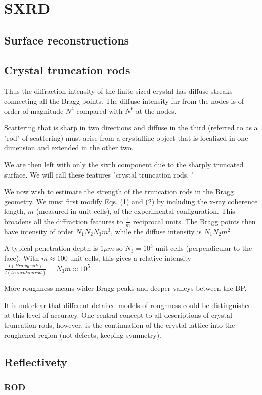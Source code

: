 \section{SXRD}


\subsection{Surface reconstructions}


\subsection{Crystal truncation rods}

Thus the diffraction intensity of the finite-sized crystal has diffuse streaks connecting all the Bragg points. The diffuse intensity far from the nodes is of order of magnitude $N^4$ compared with $N^6$ at the nodes.

Scattering that is sharp in two directions and diffuse in the third (referred to as a "rod" of scattering) must arise from a crystalline object that is localized in one dimension and extended in the other two.

We are then left with only the sixth component due to the sharply truncated surface. We will call these features "crystal truncation rods. '

We now wish to estimate the strength of the truncation rods in the Bragg geometry. We must first modify Eqs. (1) and (2) by including the x-ray coherence length, $m$ (measured in unit cells), of the experimental configuration. This broadens all the diffraction features to $\frac{1}{m}$ reciprocal units. The Bragg points then have intensity of order $N_1 N_2 N_3 m^3$, while the diffuse intensity is $N_1 N_2 m^2$

A typical penetration depth is $1 \mu m$ so $N_3 =10^3$ unit cells (perpendicular to the face). With $m \approx 100$ unit cells, this gives a relative intensity
$\frac{I(Bragg peak)}{I(truncation rod)} = N_3 m \approx 10^5$

More roughness means wider Bragg peaks and deeper valleys between the BP.

It is not clear that different detailed models of roughness could be distinguished at this level of accuracy. One central concept to all descriptions of crystal truncation rods, however, is the continuation of the crystal lattice into the roughened region (not defects, keeping symmetry).


\subsection{Reflectivety}


\subsubsection{ROD}
